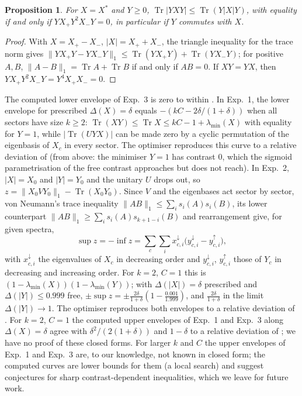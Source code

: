 \documentclass[11pt]{article}
\DeclareMathOperator{\Tr}{Tr}
\newtheorem{proposition}{Proposition}
\begin{document}
\begin{proposition}
For $X=X^*$ and $Y\ge0$, $\Tr|YXY|\le\Tr(Y|X|Y)$, with equality if and only if $YX_+Y^2X_-Y=0$, in particular
if $Y$ commutes with $X$.
\end{proposition}
\begin{proof}
With $X=X_+-X_-$, $|X|=X_++X_-$, the triangle inequality for the trace norm gives
$\|YX_+Y-YX_-Y\|_1\le\Tr(YX_+Y)+\Tr(YX_-Y)$; for positive $A,B$, $\|A-B\|_1=\Tr A+\Tr B$ if and only if
$AB=0$. If $XY=YX$, then $YX_+Y^2X_-Y=Y^4X_+X_-=0$.
\end{proof}
\noindent The computed lower envelope of Exp.~3 is zero to within . In Exp.~1, the lower envelope
for prescribed $\Delta(X)=\delta$ equals $-(kC-2\delta/(1+\delta))$ when all sectors have size $k\ge2$:
$\Tr(XY)\le\Tr X\le kC-1+\lambda_{\min}(X)$ with equality for $Y=1$, while $|\Tr(UYX)|$ can be made zero
by a cyclic permutation of the eigenbasis of $X_c$ in every sector. The optimiser reproduces this curve to a relative deviation of
 (from above: the minimiser $Y=1$ has contrast $0$, which
the sigmoid parametrisation of the free contrast approaches but does not reach). In Exp.~2, $|X|=X_0$ and
$|Y|=Y_0$ and the unitary $U$ drops out, so $z=\|X_0VY_0\|_1-\Tr(X_0Y_0)$. Since $V$ and the eigenbases act
sector by sector, von Neumann's trace inequality $\|AB\|_1\le\sum_is_i(A)s_i(B)$, its lower counterpart
$\|AB\|_1\ge\sum_is_i(A)s_{k+1-i}(B)$ and rearrangement give, for given spectra,
\[
  \sup z=-\inf z=\sum_c\sum_i x_{c,i}^\downarrow\bigl(y_{c,i}^\downarrow-y_{c,i}^\uparrow\bigr),
\]
with $x_{c,i}^\downarrow$ the eigenvalues of $X_c$ in decreasing order and $y_{c,i}^\downarrow$, $y_{c,i}^\uparrow$ those of
$Y_c$ in decreasing and increasing order. For $k=2$, $C=1$ this is $(1-\lambda_{\min}(X))(1-\lambda_{\min}(Y))$; with
$\Delta(|X|)=\delta$ prescribed and $\Delta(|Y|)\le0.999$ free, $\pm\sup z=\pm\frac{2\delta}{1+\delta}(1-\frac{0.001}{1.999})$, and
$\frac{2\delta}{1+\delta}$ in the limit $\Delta(|Y|)\to1$. The optimiser reproduces both envelopes to a relative deviation of
.
For $k=2$, $C=1$ the computed upper envelopes of Exp.~1 and Exp.~3 along $\Delta(X)=\delta$ agree with
$\delta^2/(2(1+\delta))$ and $1-\delta$ to a relative deviation of
; we have no proof of
these closed forms. For larger $k$ and $C$ the upper envelopes of Exp.~1 and Exp.~3 are, to our knowledge, not known in
closed form; the computed curves are lower bounds for them (a local search) and suggest conjectures for sharp
contrast-dependent inequalities, which we leave for future work.
\end{document}
